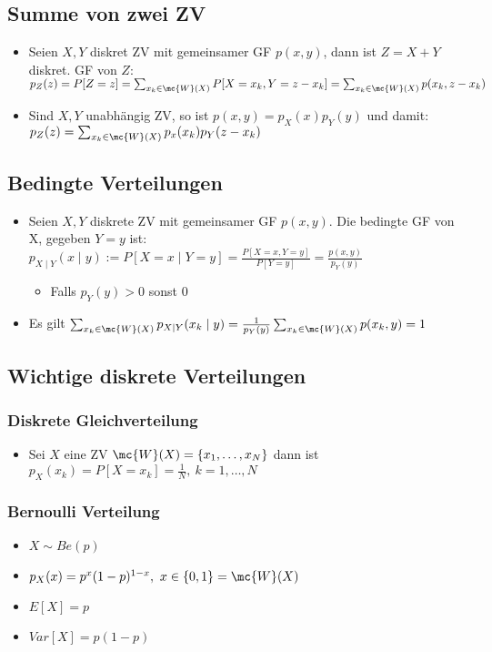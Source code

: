 \subsection{Summe von zwei ZV}
\begin{itemize}
    \item Seien $X, Y$ diskret ZV mit gemeinsamer GF $p(x, y)$, dann ist $Z = X + Y$ diskret. GF von $Z$: $p_Z(z) = P[Z = z] = \sum_{x_k \in \mc{W}(X)} P[X = x_k, Y = z - x_k] = \sum_{x_k \in \mc{W}(X)} p(x_k, z - x_k)$
    \item Sind $X, Y$ unabhängig ZV, so ist $p(x, y) = p_X(x) p_Y(y)$ und damit: $p_Z(z) = \sum_{x_k \in \mc{W}(X)} p_x(x_k) p_Y(z - x_k)$
\end{itemize}

\subsection{Bedingte Verteilungen}
\begin{itemize}
    \item Seien $X, Y$ diskrete ZV mit gemeinsamer GF $p(x, y)$. Die bedingte GF von X, gegeben $Y = y$ ist:\\ $p_{X \mid Y} (x \mid y) := P[X = x \mid Y = y] = \frac{P[X = x, Y = y]}{P[Y = y]} = \frac{p(x,y)}{p_Y(y)}$
        \begin{itemize}
            \item Falls $p_Y(y) > 0$ sonst $0$
        \end{itemize}
    \item Es gilt $\sum_{x_k \in \mc{W}(X)} p_{X \mid Y} (x_k \mid y) = \frac{1}{p_Y(y)} \sum_{x_k \in \mc{W}(X)} p(x_k, y) = 1$
\end{itemize}

\subsection{Wichtige diskrete Verteilungen}
\subsubsection{Diskrete Gleichverteilung}
\begin{itemize}
    \item Sei $X$ eine ZV $\mc{W}(X) = \{x_1, \dots, x_N\}$ dann ist $p_X(x_k) = P[X = x_k] = \frac{1}{N}, \ k = 1,\dots, N$
\end{itemize}

\subsubsection{Bernoulli Verteilung}
\begin{itemize}
    \item $X \sim Be(p)$
    \item $p_X(x) = p^x(1-p)^{1-x}, \ x \in \{0,1\} = \mc{W}(X)$
    \item $E[X] = p$
    \item $Var[X] = p(1 - p)$
\end{itemize}

